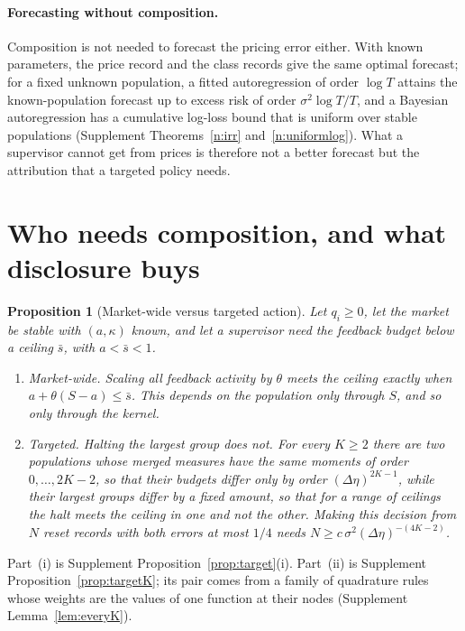 \documentclass[12pt]{article}
\newtheorem{proposition}[theorem]{Proposition}
\theoremstyle{definition}
\theoremstyle{remark}
\begin{document}
\paragraph{Forecasting without composition.} Composition is not needed to forecast the pricing error either. With known parameters, the price record and the class records give the same optimal forecast; for a fixed unknown population, a fitted autoregression of order $\log T$ attains the known-population forecast up to excess risk of order $\sigma^2\log T/T$, and a Bayesian autoregression has a cumulative log-loss bound that is uniform over stable populations (Supplement Theorems~\ref{n:irr} and~\ref{n:uniformlog}). What a supervisor cannot get from prices is therefore not a better forecast but the attribution that a targeted policy needs.

\section{Who needs composition, and what disclosure buys}\label{n:sup}

\begin{proposition}[Market-wide versus targeted action]\label{n:target}
Let $q_i\ge0$, let the market be stable with $(a,\kappa)$ known, and let a supervisor need the feedback budget below a ceiling $\bar s$, with $a<\bar s<1$.
\begin{enumerate}[label=(\roman*),itemsep=1pt]
\item \emph{Market-wide.} Scaling all feedback activity by $\theta$ meets the ceiling exactly when $a+\theta(S-a)\le\bar s$. This depends on the population only through $S$, and so only through the kernel.
\item \emph{Targeted.} Halting the largest group does not. For every $K\ge2$ there are two populations whose merged measures have the same moments of order $0,\ldots,2K-2$, so that their budgets differ only by order $(\Delta\eta)^{2K-1}$, while their largest groups differ by a fixed amount, so that for a range of ceilings the halt meets the ceiling in one and not the other. Making this decision from $N$ reset records with both errors at most $1/4$ needs $N\ge c\,\sigma^2(\Delta\eta)^{-(4K-2)}$.
\end{enumerate}
\end{proposition}

Part~(i) is Supplement Proposition~\ref{prop:target}(i). Part~(ii) is Supplement Proposition~\ref{prop:targetK}; its pair comes from a family of quadrature rules whose weights are the values of one function at their nodes (Supplement Lemma~\ref{lem:everyK}).
\end{document}
